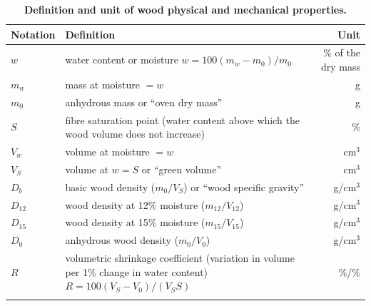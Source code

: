 \documentclass[a4paper, 12pt, leqno, dvipsnames]{article}\usepackage[]{graphicx}\usepackage[]{color}
\begin{document}
\setcounter{table}{0}
\renewcommand{\tablename}{Supporting Information}
\renewcommand{\thetable}{S\arabic{table}}
\renewcommand{\theHtable}{SuppInfo.\thetable}


\begin{longtable}{@{}lL{8cm}r@{}}
  \caption{\textbf{Definition and unit of wood physical and mechanical properties.}}\label{sm:Definitions}\\
  \toprule
  Notation & Definition & Unit \\
  \midrule
  $w$ & water content or moisture \newline $w=100 (m_w-m_0)/m_0$ & \% of the dry mass \\
  $m_w$ & mass at moisture $=w$ & g \\
  $m_0$ & anhydrous mass or ``oven dry mass'' & g \\
  $S$ & fibre saturation point (water content above which the wood volume does not
  increase) & \% \\
  $V_w$ & volume at moisture $=w$ & cm$^3$ \\
  $V_S$ & volume at $w=S$ or ``green volume'' & cm$^3$ \\
  $D_b$ & basic wood density ($m_0/V_S$) or ``wood specific gravity'' & g/cm$^3$ \\
  $D_{12}$ & wood density at 12\% moisture ($m_{12}/V_{12}$) & g/cm$^3$ \\
  $D_{15}$ & wood density at 15\% moisture ($m_{15}/V_{15}$) & g/cm$^3$ \\
  $D_0$ & anhydrous wood density ($m_0/V_0$) & g/cm$^3$ \\
  $R$ & volumetric shrinkage coefficient (variation in volume
  per 1\% change in water content) \newline $R=100 (V_S-V_0) / (V_S S)$ & \%/\% \\
  \bottomrule\\
\end{longtable}

\newpage
\end{document}
